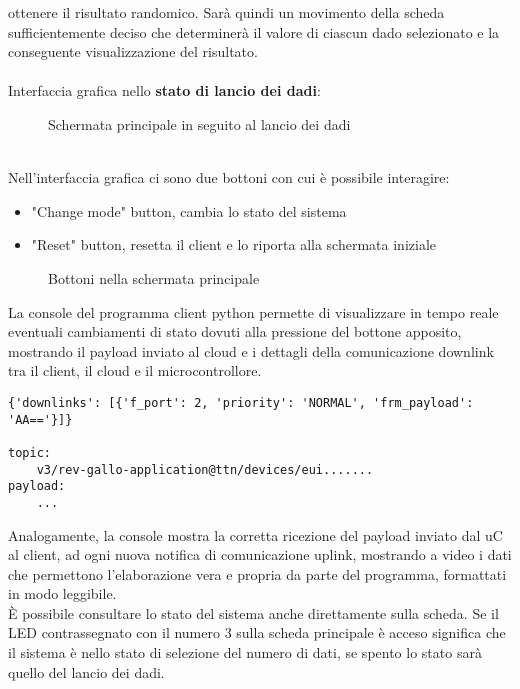 ottenere il risultato randomico. Sarà quindi un movimento della scheda sufficientemente deciso che determinerà il valore di ciascun dado selezionato
e la conseguente visualizzazione del risultato.
\\\\Interfaccia grafica nello \textbf{stato di lancio dei dadi}:
\begin{figure}[h!]
    \centering
    \caption{Schermata principale in seguito al lancio dei dadi}
    \label{fig:RollStateON}
\end{figure}
\\Nell'interfaccia grafica ci sono due bottoni con cui è possibile interagire:
\begin{itemize}
    \item "Change mode" button, cambia lo stato del sistema
    \item "Reset" button, resetta il client e lo riporta alla schermata iniziale
\end{itemize}
\begin{figure}[h!]
    \centering
    \caption{Bottoni nella schermata principale}
    \label{fig:HomePageButtons}
\end{figure}

La console del programma client python permette di visualizzare in tempo reale eventuali cambiamenti di stato dovuti alla pressione del bottone apposito, 
mostrando il payload inviato al cloud e i dettagli della comunicazione downlink tra il client, il cloud e il microcontrollore.

\begin{verbatim}
{'downlinks': [{'f_port': 2, 'priority': 'NORMAL', 'frm_payload': 'AA=='}]}

topic:
    v3/rev-gallo-application@ttn/devices/eui.......
payload:
    ...
\end{verbatim}

Analogamente, la console mostra la corretta ricezione del payload inviato dal uC al client, ad ogni nuova notifica di comunicazione uplink, 
mostrando a video i dati che permettono l'elaborazione vera e propria da parte del programma, formattati in modo leggibile.\\

È possibile consultare lo stato del sistema anche direttamente sulla scheda. Se il LED contrassegnato con il numero 3 sulla scheda principale 
è acceso significa che il sistema è nello stato di selezione del numero di dati, se spento lo stato sarà quello del lancio dei dadi.













